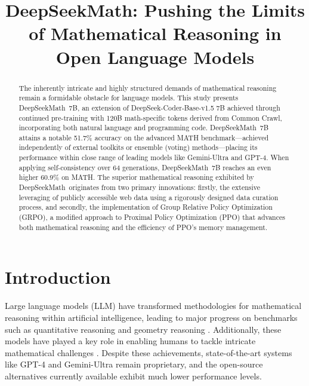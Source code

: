 \title{DeepSeekMath: Pushing the Limits of Mathematical Reasoning in Open Language Models}

\begin{abstract}
The inherently intricate and highly structured demands of mathematical reasoning remain a formidable obstacle for language models. This study presents DeepSeekMath~7B, an extension of DeepSeek-Coder-Base-v1.5 7B achieved through continued pre-training with 120B math-specific tokens derived from Common Crawl, incorporating both natural language and programming code. DeepSeekMath~7B attains a notable 51.7\% accuracy on the advanced MATH benchmark—achieved independently of external toolkits or ensemble (voting) methods—placing its performance within close range of leading models like Gemini-Ultra and GPT-4. When applying self-consistency over 64 generations, DeepSeekMath~7B reaches an even higher 60.9\% on MATH. The superior mathematical reasoning exhibited by DeepSeekMath~originates from two primary innovations: firstly, the extensive leveraging of publicly accessible web data using a rigorously designed data curation process, and secondly, the implementation of Group Relative Policy Optimization (GRPO), a modified approach to Proximal Policy Optimization (PPO) that advances both mathematical reasoning and the efficiency of PPO's memory management.
\end{abstract}

\section{Introduction}

Large language models (LLM) have transformed methodologies for mathematical reasoning within artificial intelligence, leading to major progress on benchmarks such as quantitative reasoning \citep{MATH} and geometry reasoning \citep{trinh2024solving}. Additionally, these models have played a key role in enabling humans to tackle intricate mathematical challenges \citep{tao}. Despite these achievements, state-of-the-art systems like GPT-4 \citep{gpt4} and Gemini-Ultra \citep{gemini} remain proprietary, and the open-source alternatives currently available exhibit much lower performance levels.

